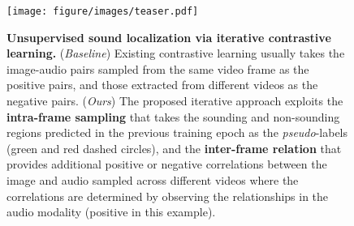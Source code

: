 \begin{figure}[t!]
    \centering
	\texttt{[image: figure/images/teaser.pdf]}
	\vspace{-2mm}
    \caption{
    \textbf{Unsupervised sound localization via iterative contrastive learning.} 
    (\textit{Baseline}) Existing contrastive learning usually takes the image-audio pairs sampled from the same video frame as the positive pairs, and those extracted from different videos as the negative pairs. 
    (\textit{Ours}) %
    The proposed iterative approach exploits the \textbf{intra-frame sampling} that takes the sounding and non-sounding regions predicted in the previous training epoch as the \emph{pseudo}-labels (green and red dashed circles), and the \textbf{inter-frame relation} that provides additional positive or negative correlations between the image and audio sampled across different videos where the correlations are determined by observing the relationships in the audio modality (positive in this example).
    }
	\label{fig:teaser}
	\vspace{-3.5mm}
\end{figure}
